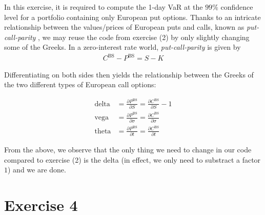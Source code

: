 \documentclass[10pt,a4paper]{article}
\theoremstyle{definition}
\begin{document}
	In this exercise, it is required to compute the 1-day VaR at the $99\%$ confidence level for a portfolio containing only European put options. Thanks to an intricate relationship between the values/prices of European puts and calls, known as \emph{put-call-parity} \cite{G03}, we may reuse the code from exercise (2) by only slightly changing some of the Greeks. In a zero-interest rate world, \emph{put-call-parity} is given by	
	\begin{align*}
	C^{\text{BS}}- P^{\text{BS}} = S - K
	\end{align*}
	
	Differentiating on both sides then yields the relationship between the Greeks of the two different types of European call options:
	
	\begin{align}
	\text{delta} &= \frac{\partial P^{\text{BS}}}{\partial S} = \frac{\partial C^{\text{BS}}}{\partial S} -1  \\
	\text{vega} &= \frac{\partial P^{\text{BS}}}{\partial \sigma} = \frac{\partial C^{\text{BS}}}{\partial \sigma} \\
	\text{theta} &= \frac{\partial P^{\text{BS}}}{\partial t} = \frac{\partial C^{\text{BS}}}{\partial t}
	\end{align}
	
	From the above, we observe that the only thing we need to change in our code compared to exercise (2) is the delta (in effect, we only need to substract a factor $1$) and we are done.
	
	
	
	\section*{Exercise 4}
	
	



\end{document}
